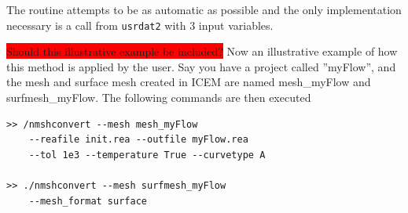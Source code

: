 The routine attempts to be as automatic as possible and the only implementation necessary is 
a call from \verb|usrdat2| with 3 input variables.

\colorbox{red}{Should this illustrative example be included?}
Now an illustrative example of how this method is applied by the user. Say you have a project
called ''myFlow'', and the mesh and surface mesh created in ICEM are named mesh\_myFlow and 
surfmesh\_myFlow. The following commands are then executed

%

% 
\begingroup
\fontsize{12pt}{14pt}
\begin{lstlisting}[escapechar=|,frame=none]
>> /nmshconvert --mesh mesh_myFlow 
    --reafile init.rea --outfile myFlow.rea
    --tol 1e3 --temperature True --curvetype A

>> ./nmshconvert --mesh surfmesh_myFlow 
    --mesh_format surface

\end{lstlisting}
\endgroup
% 
% 
